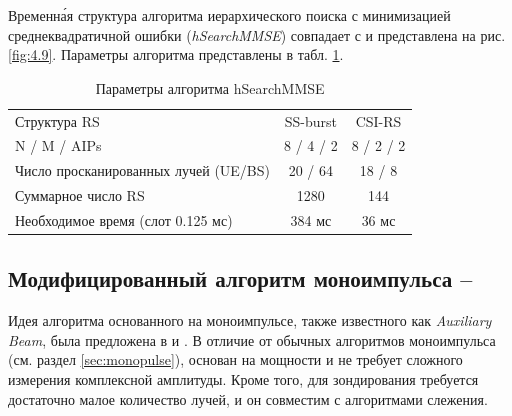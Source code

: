 Временн\'{а}я структура алгоритма иерархического поиска с минимизацией
среднеквадратичной ошибки (\textit{hSearchMMSE}) совпадает с \baseline{} и представлена на рис. \ref{fig:4.9}.
Параметры алгоритма представлены в табл. \ref{tab:4.3}.
\begin{table}
    \centering
    \caption{Параметры алгоритма hSearchMMSE}
    \label{tab:4.3}
    \begin{tabular}{lcc}
        \toprule
        \midrule
        Структура RS                                  & SS-burst  & CSI-RS    \\
        N / M / AIPs                                  & 8 / 4 / 2 & 8 / 2 / 2 \\
        Число просканированных \newline лучей (UE/BS) & 20 / 64   & 18 / 8    \\
        Суммарное число RS                            & 1280      & 144       \\
        Необходимое время (слот 0.125 мс)             & 384 мс    & 36 мс     \\
        \bottomrule
    \end{tabular}
\end{table}

\subsection[Модифицированный алгоритм моноимпульса]{Модифицированный алгоритм моноимпульса -- \AuxBeam{}}
\label{sec:AuxBeam:singlepath}
Идея алгоритма основанного на моноимпульсе, также известного как \textit{Auxiliary Beam}, была
предложена в \cite{Zhu2016} и \cite{Kim2019}. В отличие от обычных алгоритмов
моноимпульса (см. раздел \ref{sec:monopulse}), \AuxBeam{} основан на мощности и не
требует сложного измерения комплексной амплитуды. Кроме того, для зондирования требуется
достаточно малое количество лучей, и он совместим с алгоритмами слежения.

